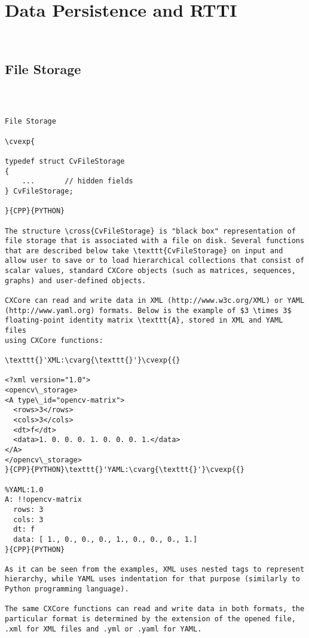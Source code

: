 \section{Data Persistence and RTTI}
\begin{verbatim}


\end{verbatim}
\subsection{File Storage}
\begin{verbatim}


\end{verbatim}
\begin{verbatim}

File Storage

\cvexp{

typedef struct CvFileStorage
{
    ...       // hidden fields
} CvFileStorage;

}{CPP}{PYTHON}

The structure \cross{CvFileStorage} is "black box" representation of file storage that is associated with a file on disk. Several functions that are described below take \texttt{CvFileStorage} on input and allow user to save or to load hierarchical collections that consist of scalar values, standard CXCore objects (such as matrices, sequences, graphs) and user-defined objects.

CXCore can read and write data in XML (http://www.w3c.org/XML) or YAML
(http://www.yaml.org) formats. Below is the example of $3 \times 3$
floating-point identity matrix \texttt{A}, stored in XML and YAML files
using CXCore functions:

\texttt{}'XML:\cvarg{\texttt{}'}\cvexp{{}

<?xml version="1.0">
<opencv\_storage>
<A type\_id="opencv-matrix">
  <rows>3</rows>
  <cols>3</cols>
  <dt>f</dt>
  <data>1. 0. 0. 0. 1. 0. 0. 0. 1.</data>
</A>
</opencv\_storage>
}{CPP}{PYTHON}\texttt{}'YAML:\cvarg{\texttt{}'}\cvexp{{}

%YAML:1.0
A: !!opencv-matrix
  rows: 3
  cols: 3
  dt: f
  data: [ 1., 0., 0., 0., 1., 0., 0., 0., 1.]
}{CPP}{PYTHON}

As it can be seen from the examples, XML uses nested tags to represent hierarchy, while YAML uses indentation for that purpose (similarly to Python programming language).

The same CXCore functions can read and write data in both formats, the particular format is determined by the extension of the opened file, .xml for XML files and .yml or .yaml for YAML.


\end{verbatim}
